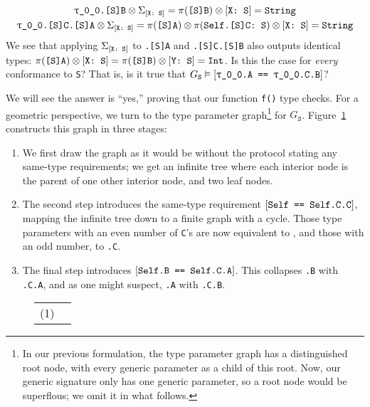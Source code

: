 \documentclass[../generics]{subfiles}
\begin{document}
\begin{example}
\begin{gather*}
\texttt{\texttt{$\uptau$\_0\_0}.[S]B}\otimes\Sigma_{[\texttt{X:~S}]}=\pi(\texttt{[S]B})\otimes[\texttt{X:~S}]=\texttt{String}\\
\texttt{\texttt{$\uptau$\_0\_0}.[S]C.[S]A}\otimes\Sigma_{[\texttt{X:~S}]}=\pi(\texttt{[S]A})\otimes\pi(\texttt{Self.[S]C:~S})\otimes[\texttt{X:~S}]=\texttt{String}
\end{gather*}
We see that applying $\Sigma_{[\texttt{X:~S}]}$ to \texttt{.[S]A} and \texttt{.[S]C.[S]B} also outputs identical types: $\pi(\texttt{[S]A})\otimes[\texttt{X:~S}]=\pi(\texttt{[S]B})\otimes[\texttt{Y:~S}]=\texttt{Int}$. Is this the case for \emph{every} conformance to \texttt{S}? That is, is it true that $G_\texttt{S}\vDash[\texttt{\texttt{\texttt{$\uptau$\_0\_0}.A} == \texttt{\texttt{$\uptau$\_0\_0}.C.B}}]$?

We will see the answer is ``yes,'' proving that our function \texttt{f()} type checks. For a geometric perspective, we turn to the type parameter graph\footnote{In our previous formulation, the type parameter graph has a distinguished root node, with every generic parameter as a child of this root. Now, our generic signature only has one generic parameter, so a root node would be superflous; we omit it in what follows.} for $G_\texttt{S}$. Figure~\ref{protocol s fig} constructs this graph in three stages:
\begin{enumerate}
\item We first draw the graph as it would be without the protocol stating any same-type requirements; we get an infinite tree where each interior node is the parent of one other interior node, and two leaf nodes.

\item The second step introduces the same-type requirement $[\texttt{Self == Self.C.C}]$, mapping the infinite tree down to a finite graph with a cycle. Those type parameters with an even number of \texttt{C}'s are now equivalent to \texttt{}, and those with an odd number, to \texttt{.C}.

\item The final step introduces $[\texttt{Self.B == Self.C.A}]$. This collapses \texttt{.B} with \texttt{.C.A}, and as one might suspect, \texttt{.A} with \texttt{.C.B}.
\end{enumerate}

\begin{figure}\label{protocol s fig}
\begin{center}
\begin{tabular}{lc}
\toprule
(1) &
\begin{tikzpicture}


\end{tikzpicture}
\end{tabular}
\end{center}
\end{figure}
\end{example}
\end{document}
